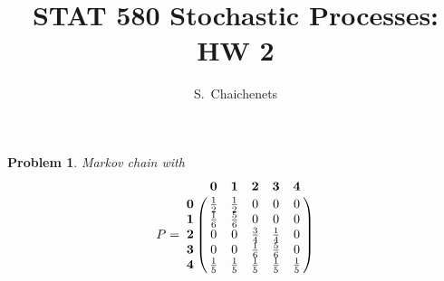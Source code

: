 \documentclass[8pt,notitlepage,twocolumn]{report}
\newtheorem{problem}{Problem}
\begin{document}
\title{STAT 580 Stochastic Processes: HW 2}
\author{ S.\ Chaichenets }
\maketitle



\begin{problem}
Markov chain with 
\small
\begin{equation}
P = 
\bordermatrix{
	& \mathbf{0} & \mathbf{1} & \mathbf{2} & \mathbf{3} & \mathbf{4} \cr
\mathbf{0} &  \frac{1}{2} & \frac{1}{2} & 0 & 0 & 0 \cr
\mathbf{1} &  \frac{1}{6} & \frac{5}{6} & 0 & 0 & 0 \cr
\mathbf{2} &  0 & 0 & \frac{3}{4} & \frac{1}{4} & 0 \cr
\mathbf{3} &  0 & 0 & \frac{1}{6} & \frac{5}{6} & 0 \cr
\mathbf{4} &  \frac{1}{5} & \frac{1}{5} & \frac{1}{5} & \frac{1}{5} & \frac{1}{5} \cr
}
\end{equation}
\normalsize


\end{problem}
\end{document}
